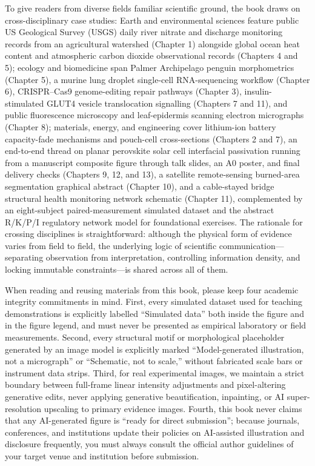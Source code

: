 To give readers from diverse fields familiar scientific ground, the book draws on cross-disciplinary case studies: Earth and environmental sciences feature public US Geological Survey (USGS) daily river nitrate and discharge monitoring records from an agricultural watershed (Chapter 1) alongside global ocean heat content and atmospheric carbon dioxide observational records (Chapters 4 and 5); ecology and biomedicine span Palmer Archipelago penguin morphometrics (Chapter 5), a murine lung droplet single-cell RNA-sequencing workflow (Chapter 6), CRISPR--Cas9 genome-editing repair pathways (Chapter 3), insulin-stimulated GLUT4 vesicle translocation signalling (Chapters 7 and 11), and public fluorescence microscopy and leaf-epidermis scanning electron micrographs (Chapter 8); materials, energy, and engineering cover lithium-ion battery capacity-fade mechanisms and pouch-cell cross-sections (Chapters 2 and 7), an end-to-end thread on planar perovskite solar cell interfacial passivation running from a manuscript composite figure through talk slides, an A0 poster, and final delivery checks (Chapters 9, 12, and 13), a satellite remote-sensing burned-area segmentation graphical abstract (Chapter 10), and a cable-stayed bridge structural health monitoring network schematic (Chapter 11), complemented by an eight-subject paired-measurement simulated dataset and the abstract R/K/P/I regulatory network model for foundational exercises. The rationale for crossing disciplines is straightforward: although the physical form of evidence varies from field to field, the underlying logic of scientific communication---separating observation from interpretation, controlling information density, and locking immutable constraints---is shared across all of them.

When reading and reusing materials from this book, please keep four academic integrity commitments in mind. First, every simulated dataset used for teaching demonstrations is explicitly labelled ``Simulated data'' both inside the figure and in the figure legend, and must never be presented as empirical laboratory or field measurements. Second, every structural motif or morphological placeholder generated by an image model is explicitly marked ``Model-generated illustration, not a micrograph'' or ``Schematic, not to scale,'' without fabricated scale bars or instrument data strips. Third, for real experimental images, we maintain a strict boundary between full-frame linear intensity adjustments and pixel-altering generative edits, never applying generative beautification, inpainting, or AI super-resolution upscaling to primary evidence images. Fourth, this book never claims that any AI-generated figure is ``ready for direct submission''; because journals, conferences, and institutions update their policies on AI-assisted illustration and disclosure frequently, you must always consult the official author guidelines of your target venue and institution before submission.

